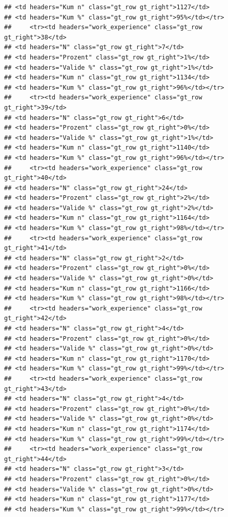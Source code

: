 \documentclass[
  a4paper,
  DIV=11,
  numbers=noendperiod]{scrartcl}
\begin{document}
\begin{verbatim}
## <td headers="Kum n" class="gt_row gt_right">1127</td>
## <td headers="Kum %" class="gt_row gt_right">95%</td></tr>
##     <tr><td headers="work_experience" class="gt_row gt_right">38</td>
## <td headers="N" class="gt_row gt_right">7</td>
## <td headers="Prozent" class="gt_row gt_right">1%</td>
## <td headers="Valide %" class="gt_row gt_right">1%</td>
## <td headers="Kum n" class="gt_row gt_right">1134</td>
## <td headers="Kum %" class="gt_row gt_right">96%</td></tr>
##     <tr><td headers="work_experience" class="gt_row gt_right">39</td>
## <td headers="N" class="gt_row gt_right">6</td>
## <td headers="Prozent" class="gt_row gt_right">0%</td>
## <td headers="Valide %" class="gt_row gt_right">1%</td>
## <td headers="Kum n" class="gt_row gt_right">1140</td>
## <td headers="Kum %" class="gt_row gt_right">96%</td></tr>
##     <tr><td headers="work_experience" class="gt_row gt_right">40</td>
## <td headers="N" class="gt_row gt_right">24</td>
## <td headers="Prozent" class="gt_row gt_right">2%</td>
## <td headers="Valide %" class="gt_row gt_right">2%</td>
## <td headers="Kum n" class="gt_row gt_right">1164</td>
## <td headers="Kum %" class="gt_row gt_right">98%</td></tr>
##     <tr><td headers="work_experience" class="gt_row gt_right">41</td>
## <td headers="N" class="gt_row gt_right">2</td>
## <td headers="Prozent" class="gt_row gt_right">0%</td>
## <td headers="Valide %" class="gt_row gt_right">0%</td>
## <td headers="Kum n" class="gt_row gt_right">1166</td>
## <td headers="Kum %" class="gt_row gt_right">98%</td></tr>
##     <tr><td headers="work_experience" class="gt_row gt_right">42</td>
## <td headers="N" class="gt_row gt_right">4</td>
## <td headers="Prozent" class="gt_row gt_right">0%</td>
## <td headers="Valide %" class="gt_row gt_right">0%</td>
## <td headers="Kum n" class="gt_row gt_right">1170</td>
## <td headers="Kum %" class="gt_row gt_right">99%</td></tr>
##     <tr><td headers="work_experience" class="gt_row gt_right">43</td>
## <td headers="N" class="gt_row gt_right">4</td>
## <td headers="Prozent" class="gt_row gt_right">0%</td>
## <td headers="Valide %" class="gt_row gt_right">0%</td>
## <td headers="Kum n" class="gt_row gt_right">1174</td>
## <td headers="Kum %" class="gt_row gt_right">99%</td></tr>
##     <tr><td headers="work_experience" class="gt_row gt_right">44</td>
## <td headers="N" class="gt_row gt_right">3</td>
## <td headers="Prozent" class="gt_row gt_right">0%</td>
## <td headers="Valide %" class="gt_row gt_right">0%</td>
## <td headers="Kum n" class="gt_row gt_right">1177</td>
## <td headers="Kum %" class="gt_row gt_right">99%</td></tr>

\end{verbatim}
\end{document}
